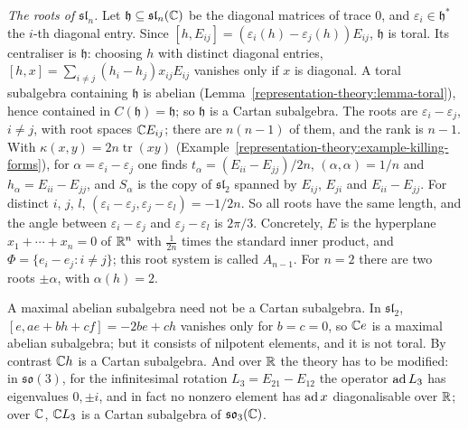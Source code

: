 \begin{example}\label{representation-theory:example-roots-sln}
\emph{The roots of $\mathfrak{sl}_n$.} Let $\mathfrak{h} \subseteq \mathfrak{sl}_n(\mathbb{C})$ be the diagonal matrices of trace $0$, and $\varepsilon_i \in \mathfrak{h}^*$ the $i$-th diagonal
entry. Since $[h, E_{ij}] = (\varepsilon_i(h) - \varepsilon_j(h))E_{ij}$, $\mathfrak{h}$ is toral. Its centraliser is $\mathfrak{h}$: choosing $h$ with distinct diagonal entries, $[h, x] =
\sum_{i \neq j}(h_i - h_j)x_{ij}E_{ij}$ vanishes only if $x$ is diagonal. A toral subalgebra containing $\mathfrak{h}$ is abelian (Lemma~\ref{representation-theory:lemma-toral}), hence
contained in $C(\mathfrak{h}) = \mathfrak{h}$; so $\mathfrak{h}$ is a Cartan subalgebra. The roots are $\varepsilon_i - \varepsilon_j$, $i \neq j$, with root spaces $\mathbb{C} E_{ij}$; there are
$n(n - 1)$ of them, and the rank is $n - 1$. With $\kappa(x, y) = 2n\operatorname{tr}(xy)$ (Example~\ref{representation-theory:example-killing-forms}), for $\alpha = \varepsilon_i -
\varepsilon_j$ one finds $t_\alpha = (E_{ii} - E_{jj})/2n$, $(\alpha, \alpha) = 1/n$ and $h_\alpha = E_{ii} - E_{jj}$, and $S_\alpha$ is the copy of $\mathfrak{sl}_2$ spanned by
$E_{ij}$, $E_{ji}$ and $E_{ii} - E_{jj}$. For distinct $i$, $j$, $l$, $(\varepsilon_i - \varepsilon_j, \varepsilon_j - \varepsilon_l) = -1/2n$. So all roots have the same length, and
the angle between $\varepsilon_i - \varepsilon_j$ and $\varepsilon_j - \varepsilon_l$ is $2\pi/3$. Concretely, $E$ is the hyperplane $x_1 + \cdots + x_n = 0$ of $\mathbb{R}^n$ with $\frac1{2n}$
times the standard inner product, and $\Phi = \{e_i - e_j : i \neq j\}$; this root system is called $A_{n-1}$. For $n = 2$ there are two roots $\pm\alpha$, with $\alpha(h) = 2$.
\end{example}

\begin{counterexample}\label{representation-theory:counterexample-maximal-abelian}
A maximal abelian subalgebra need not be a Cartan subalgebra. In $\mathfrak{sl}_2$, $[e, ae + bh + cf] = -2be + ch$ vanishes only for $b = c = 0$, so $\mathbb{C} e$ is a maximal abelian
subalgebra; but it consists of nilpotent elements, and it is not toral. By contrast $\mathbb{C} h$ is a Cartan subalgebra. And over $\mathbb{R}$ the theory has to be modified: in
$\mathfrak{so}(3)$, for the infinitesimal rotation $L_3 = E_{21} - E_{12}$ the operator $\operatorname{ad} L_3$ has eigenvalues $0, \pm i$, and in fact no nonzero element has $\operatorname{ad} x$ diagonalisable
over $\mathbb{R}$; over $\mathbb{C}$, $\mathbb{C} L_3$ is a Cartan subalgebra of $\mathfrak{so}_3(\mathbb{C})$.
\end{counterexample}

